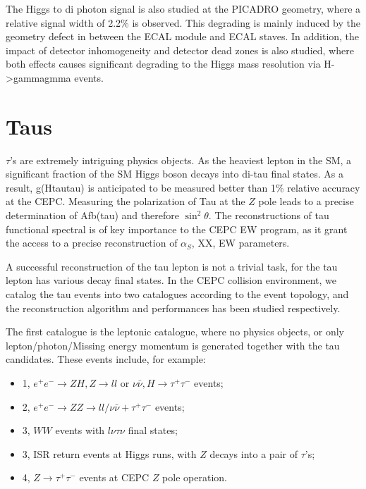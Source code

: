 The Higgs to di photon signal is also studied at the PICADRO geometry, where a relative signal width of 2.2\% is observed.
This degrading is mainly induced by the geometry defect in between the ECAL module and ECAL staves.
In addition, the impact of detector inhomogeneity and detector dead zones is also studied,
where both effects causes significant degrading to the Higgs mass resolution via H->gammagmma events. 


\section{Taus}

$\tau$'s are extremely intriguing physics objects.
As the heaviest lepton in the SM, a significant fraction of the SM Higgs boson decays into di-tau final states.
As a result, g(Htautau) is anticipated to be measured better than 1\% relative accuracy at the CEPC.
Measuring the polarization of Tau at the $Z$ pole leads to a precise determination of Afb(tau) and therefore $\sin^2\theta$.
The reconstructions of tau functional spectral is of key importance to the CEPC EW program,
as it grant the access to a precise reconstruction of $\alpha_S$, XX, EW parameters. 

A successful reconstruction of the tau lepton is not a trivial task, for the tau lepton has various decay final states.
In the CEPC collision environment, we catalog the tau events into two catalogues according to the event topology,
and the reconstruction algorithm and performances has been studied respectively. 

The first catalogue is the leptonic catalogue, where no physics objects,
or only lepton/photon/Missing energy momentum is generated together with the tau candidates.
These events include, for example: 

\begin{itemize}
\item[]1, $e^+e^- \to ZH, Z\to ll$ or $\nu\bar{\nu}, H \to \tau^+\tau^-$ events;

\item[]2, $e^+e^- \to ZZ \to ll/\nu\bar{\nu} + \tau^+\tau^-$ events;

\item[]3, $WW$ events with $l\nu \tau\nu$ final states;

\item[]3, ISR return events at Higgs runs, with $Z$ decays into a pair of $\tau$'s; 

\item[]4, $Z \to\tau^+\tau^-$ events at CEPC $Z$ pole operation. 

\end{itemize}

